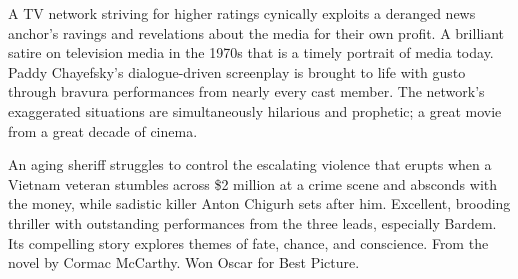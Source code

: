    A TV network striving for higher ratings cynically exploits a deranged news anchor's ravings and revelations about the media for their own profit. A brilliant satire on television media in the 1970s that is a timely portrait of media today. Paddy Chayefsky's dialogue-driven screenplay is brought to life with gusto through bravura performances from nearly every cast member. The network's exaggerated situations are simultaneously hilarious and prophetic; a great movie from a great decade of cinema. \author{DW} 

   An aging sheriff struggles to control the escalating violence that erupts when a Vietnam veteran stumbles across \$2 million at a crime scene and absconds with the money, while sadistic killer Anton Chigurh sets after him. Excellent, brooding thriller with outstanding performances from the three leads, especially Bardem. Its compelling story explores themes of fate, chance, and conscience. From the novel by Cormac McCarthy. Won Oscar for Best Picture. \author{DW} 
